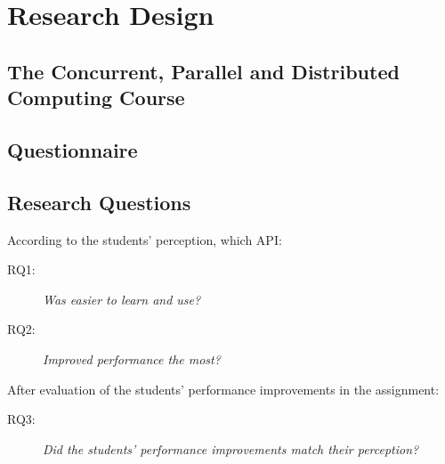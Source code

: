 \section{Research Design}
\label{sec:researchdesign}


\subsection{The Concurrent, Parallel and Distributed Computing Course}


\subsection{Questionnaire}


\subsection{Research Questions}


According to the students' perception, which API:

\begin{description}
    \item[RQ1:] \textit{Was easier to learn and use?}
    \item[RQ2:] \textit{Improved performance the most?}
\end{description}

After evaluation of the students' performance improvements
in the assignment:

\begin{description}
    \item[RQ3:] \textit{Did the students' performance improvements match their
        perception?}
\end{description}
